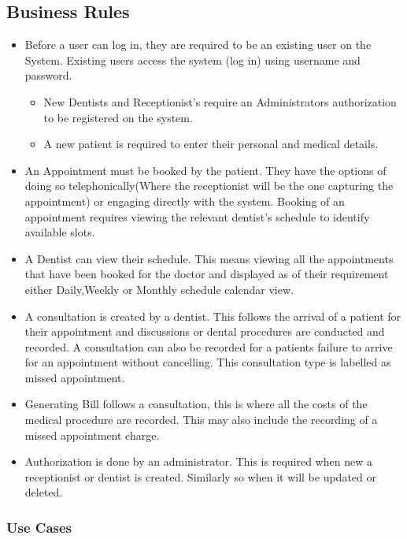 \documentclass[11 pt]{article}
\begin{document}
\subsection{Business Rules}
    \begin{itemize}
    \item
    Before a user can log in, they are required to be an existing user on the System. Existing users access the system (log in) using username and password.
    \begin{itemize}
    \item
    New Dentists and Receptionist's require an Administrators authorization to be registered on the system.
    \item
    A new patient is required to enter their personal and medical details.
    \end{itemize}
    \item
    An Appointment must be booked by the patient. They have the options of doing so telephonically(Where the receptionist will be the one capturing the appointment) or engaging directly with the system. Booking of an appointment requires viewing the relevant dentist's schedule to identify available slots.
    \item
    A Dentist can view their schedule. This means viewing all the appointments that have been booked for the doctor and displayed as of their requirement either Daily,Weekly or Monthly schedule calendar view.
    \item
    A consultation is created by a dentist. This follows the arrival of a patient for their appointment and discussions or dental procedures are conducted and recorded. A consultation can also be recorded for a patients failure to arrive for an appointment without cancelling. This consultation type is labelled as missed appointment.
    \item
    Generating Bill follows a consultation, this is where all the costs of the medical procedure are recorded. This may also include the recording of a missed appointment charge.
    \item
    Authorization is done by an administrator. This is required when new a receptionist or dentist is created. Similarly so when it will be updated or deleted.
    \end{itemize}
    
    
    \subsubsection{Use Cases}
    
\end{document}
